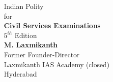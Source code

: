 \documentclass[
    fontsize=11pt
   ]{scrbook}
\begin{document}
\begin{titlepage}
\thispagestyle{empty}
\vspace*{7em}
\begin{center}
	{\fontsize{50}{60}\selectfont Indian Polity}\\
	\vspace*{2em}
	\Large{for\\ \vspace*{1em}\textbf{Civil Services Examinations}\\$5^{th}$ Edition}\\
	\vspace*{4em}
	{\LARGE\textbf{M. Laxmikanth}\\}
	Former Founder-Director\\Laxmikanth IAS Academy (closed)\\Hyderabad
\end{center}
\end{titlepage}
\end{document}
